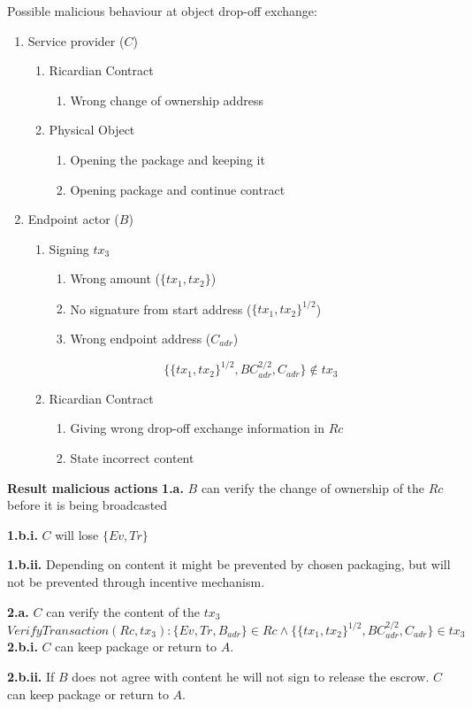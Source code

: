 Possible malicious behaviour at object drop-off exchange:
\begin{enumerate}
  \item Service provider ($C$)
  \begin{enumerate}
    \item Ricardian Contract
    \begin{enumerate}
      \item Wrong change of ownership address
    \end{enumerate}
    \item Physical Object
    \begin{enumerate}
      \item Opening the package and keeping it
      \item Opening package and continue contract
    \end{enumerate}
  \end{enumerate}
  \item Endpoint actor ($B$)
  \begin{enumerate}
    \item Signing $tx_3$
    \begin{enumerate}
      \item Wrong amount ($\{tx_1, tx_2\}$)
      \item No signature from start address ($\{tx_1, tx_2\}^{1/2}$)
      \item Wrong endpoint address ($C_{adr}$)
    \end{enumerate}
    \[\{\{tx_1, tx_2\}^{1/2}, BC_{adr}^{2/2}, C_{adr}\}\not\in tx_3\]
    \item Ricardian Contract
    \begin{enumerate}
      \item Giving wrong drop-off exchange information in $Rc$
      \item State incorrect content
    \end{enumerate}
  \end{enumerate}
\end{enumerate}

\bigbreak
\noindent\textbf{Result malicious actions}
\bigbreak
\noindent\textbf{1.a.} $B$ can verify the change of ownership of the $Rc$ before it is being broadcasted \par
\noindent\textbf{1.b.i.} $C$ will lose $\{Ev, Tr\}$ \par
\noindent\textbf{1.b.ii.} Depending on content it might be prevented by chosen packaging, but will not be prevented through incentive mechanism. \par

\noindent\textbf{2.a.} $C$ can verify the content of the $tx_3$
\[VerifyTransaction(Rc, tx_3)\colon\{Ev, Tr, B_{adr}\} \in Rc \land \{\{tx_1, tx_2\}^{1/2}, BC_{adr}^{2/2}, C_{adr}\} \in tx_3\]
\noindent\textbf{2.b.i.} $C$ can keep package or return to $A$.\par
\noindent\textbf{2.b.ii.} If $B$ does not agree with content he will not sign to release the escrow. $C$ can keep package or return to $A$.\par

